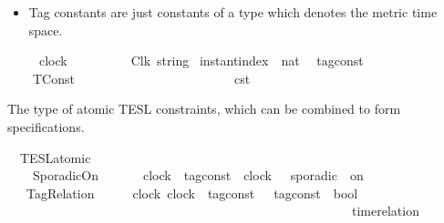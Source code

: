 \begin{isabellebody}
\begin{isamarkuptext}
\begin{itemize}
\item Tag constants are just constants of a type which denotes the metric time space.%
\end{itemize}%
\end{isamarkuptext}\isamarkuptrue%
\isamarkupfalse%
\ \ \ \ \ clock\ \ \ \ \ \ \ \ \ {\isacharequal}\ Clk\ {\isacartoucheopen}string{\isacartoucheclose}\isanewline
{}\isamarkupfalse%
\ instant{\isacharunderscore}index\ {\isacharequal}\ {\isacartoucheopen}nat{\isacartoucheclose}\isanewline
\isanewline
{}\isamarkupfalse%
\ {\isacharprime}{\isasymtau}\ tag{\isacharunderscore}const\ {\isacharequal}\isanewline
\ \ \ \ TConst\ \ \ {\isacharprime}{\isasymtau}\ \ \ \ \ \ \ \ \ \ \ \ \ \ \ \ \ \ \ \ \ \ {\isacharparenleft}{\isachardoublequoteopen}{\isasymtau}\isactrlsub c\isactrlsub s\isactrlsub t{\isachardoublequoteclose}{\isacharparenright}%
\isadelimdocument
%
\endisadelimdocument
%
\isatagdocument
%
\isamarkuptrue%
%
\endisatagdocument
{\isafolddocument}%
%
\isadelimdocument
%
\endisadelimdocument
%
\begin{isamarkuptext}%
The type of atomic TESL constraints, which can be combined to form specifications.%
\end{isamarkuptext}\isamarkuptrue%
\isamarkupfalse%
\ {\isacharprime}{\isasymtau}\ TESL{\isacharunderscore}atomic\ {\isacharequal}\isanewline
\ \ \ \ SporadicOn\ \ \ \ \ \ \ {\isacartoucheopen}clock{\isacartoucheclose}\ {\isacartoucheopen}{\isacharprime}{\isasymtau}\ tag{\isacharunderscore}const{\isacartoucheclose}\ \ {\isacartoucheopen}clock{\isacartoucheclose}\ \ {\isacharparenleft}{\isachardoublequoteopen}{\isacharunderscore}\ sporadic\ {\isacharunderscore}\ on\ {\isacharunderscore}{\isachardoublequoteclose}\ {}{}{\isacharparenright}\isanewline
\ \ {\isacharbar}\ TagRelation\ \ \ \ \ \ {\isacartoucheopen}clock{\isacartoucheclose}\ {\isacartoucheopen}clock{\isacartoucheclose}\ {\isacartoucheopen}{\isacharparenleft}{\isacharprime}{\isasymtau}\ tag{\isacharunderscore}const\ {\isasymtimes}\ {\isacharprime}{\isasymtau}\ tag{\isacharunderscore}const{\isacharparenright}\ {\isasymRightarrow}\ bool{\isacartoucheclose}\ \isanewline
\ \ \ \ \ \ \ \ \ \ \ \ \ \ \ \ \ \ \ \ \ \ \ \ \ \ \ \ \ \ \ \ \ \ \ \ \ \ \ \ \ \ \ \ \ \ \ \ \ \ \ \ \ \ {\isacharparenleft}{\isachardoublequoteopen}time{\isacharminus}relation\ {\isasymlfloor}{\isacharunderscore}{\isacharcomma}\ {\isacharunderscore}{\isasymrfloor}\ {\isasymin}\ {\isacharunderscore}{\isachardoublequoteclose}\ {}{}{\isacharparenright}\isanewline

\end{isabellebody}
